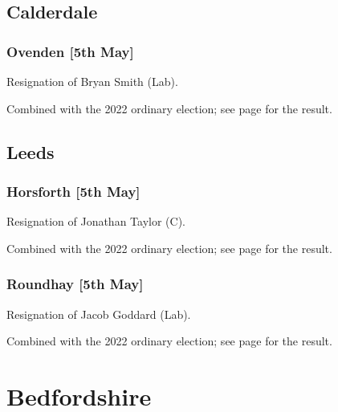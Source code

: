 \documentclass[a4paper,openany]{book}
\begin{document}
\begin{resultsiii}
\subsection*{Calderdale}

\subsubsection*{Ovenden \hspace*{\fill}\nolinebreak[1]%
	\enspace\hspace*{\fill}
	[5th May]}


Resignation of Bryan Smith (Lab).

Combined with the 2022 ordinary election; see page \pageref{CalderdaleOvenden} for the result.

\subsection*{Leeds}

\subsubsection*{Horsforth \hspace*{\fill}\nolinebreak[1]%
	\enspace\hspace*{\fill}
	[5th May]}


Resignation of Jonathan Taylor (C).

Combined with the 2022 ordinary election; see page \pageref{LeedsHorsforth} for the result.

\subsubsection*{Roundhay \hspace*{\fill}\nolinebreak[1]%
	\enspace\hspace*{\fill}
	[5th May]}


Resignation of Jacob Goddard (Lab).

Combined with the 2022 ordinary election; see page \pageref{LeedsRoundhay} for the result.

\section{Bedfordshire}


\end{resultsiii}
\end{document}
